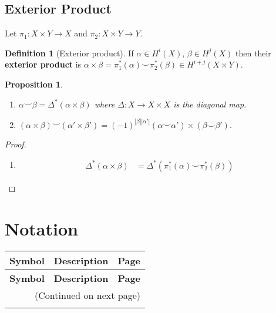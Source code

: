 \documentclass[10pt,]{book}
\newcommand{\terminology}[1]{\textbf{#1}}
\theoremstyle{plain}
\newtheorem{proposition}[theorem]{Proposition}
\theoremstyle{definition}
\newtheorem{definition}[theorem]{Definition}
\numberwithin{equation}{section}
\begin{document}
\subsection[Exterior Product]{Exterior Product}\label{subsection-12}
Let \(\pi_1 \colon X\times Y \to X\) and \(\pi_2 \colon X \times Y \to Y\).%
\begin{definition}[Exterior product]\label{definition-27}
If \(\alpha \in H^i(X)\), \(\beta\in H^j(X)\) then their \terminology{exterior product} is \(\alpha\times \beta = \pi_1^*(\alpha) \smile \pi_2^*(\beta) \in H^{i+j}(X\times Y)\).
            \end{definition}
\begin{proposition}\label{proposition-6}
\begin{enumerate}
\item{}\(\alpha\smile \beta = \Delta^*(\alpha\times \beta)\) where \(\Delta\colon X \to X\times X\) is the diagonal map.\item{}\((\alpha\times\beta)\smile (\alpha' \times \beta') = (-1)^{|\beta||\alpha'|}(\alpha \smile \alpha')\times(\beta \smile \beta').\)\end{enumerate}
\end{proposition}
\begin{proof}
\begin{enumerate}
\item{}
                  \begin{align*}
\Delta^*(\alpha\times\beta) &= \Delta^*(\pi_1^*(\alpha) \smile \pi_2^*(\beta))
\end{align*}
                \end{enumerate}
\end{proof}
%
\backmatter
%
\typeout{************************************************}
\typeout{************************************************}
\section[Notation]{Notation}\label{sec-notation}
\begin{longtable}[l]{llr}
\textbf{Symbol}&\textbf{Description}&\textbf{Page}\\[1em]
\endfirsthead
\textbf{Symbol}&\textbf{Description}&\textbf{Page}\\[1em]
\endhead
\multicolumn{3}{r}{(Continued on next page)}\\
\endfoot
\endlastfoot
$$&&\pageref{notation-1}\\
\end{longtable}
\end{document}
